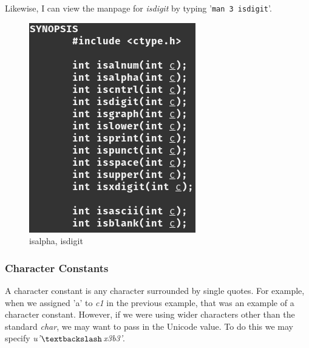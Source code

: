 \documentclass[../main.tex]{subfiles}
\begin{document}
	Likewise, I can view the manpage for \textit{isdigit} by typing '\texttt{man 3 isdigit}'.\\
	
	\begin{figure}[h]
		\centering\includegraphics[scale=0.5]{isalpha.png}
		\caption{isalpha, isdigit}
		\label{fig:isapha} %
	\end{figure}

	\subsubsection{Character Constants}
	
	A character constant is any character surrounded by single quotes.  For example, when we assigned 'a' to \textit{c1} in the previous example, that was an example of a character constant.  However, if we were using wider characters other than the standard \textit{char}, we may want to pass in the Unicode value.  To do this we may specify \textit{u'$\textbackslash$x3b3'}\cite{c_nutshell}.    
	
\end{document}
